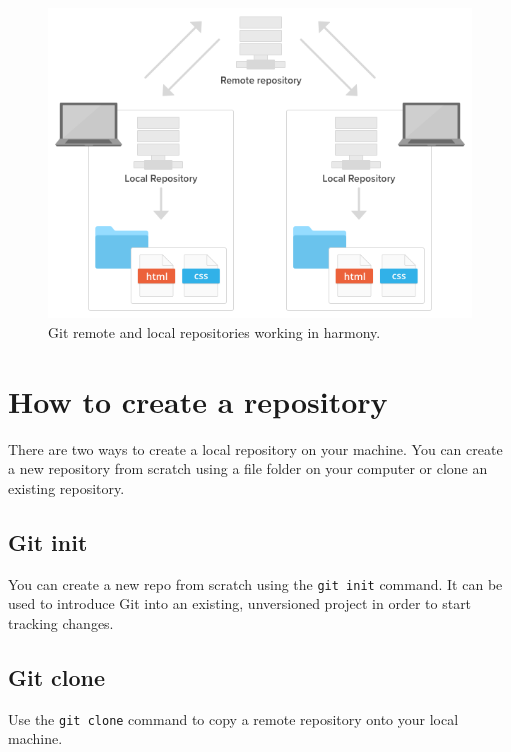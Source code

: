 \documentclass[10pt,a4paper,english]{report}
\begin{document}
    \begin{figure}[ht]
    \begin{center}
    \includegraphics[scale=0.5]{images/creating_a_repository_001.png}
    \end{center}
    \caption{Git remote and local repositories working in harmony.}
    \end{figure}

    \section{How to create a repository}

    There are two ways to create a local repository on your machine. You can create a new repository from scratch using a file folder on your computer or clone an existing repository.

    \subsection{Git init}

    You can create a new repo from scratch using the \verb|git init| command. It can be used to introduce Git into an existing, unversioned project in order to start tracking changes.

    \subsection{Git clone}

    Use the \verb|git clone| command to copy a remote repository onto your local machine.
\end{document}
